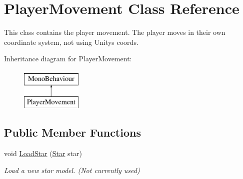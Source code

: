 \hypertarget{class_player_movement}{}\section{Player\+Movement Class Reference}
\label{class_player_movement}


This class contains the player movement. The player moves in their own coordinate system, not using Unity\textquotesingle{}s coords.  


Inheritance diagram for Player\+Movement\+:\begin{figure}[H]
\begin{center}
\leavevmode
\includegraphics[height=2.000000cm]{class_player_movement}
\end{center}
\end{figure}
\subsection*{Public Member Functions}
\begin{DoxyCompactItemize}
\item 
void \mbox{\hyperlink{class_player_movement_afe10130e4f22b8ebda23ea6b452ad5b2}{Load\+Star}} (\mbox{\hyperlink{struct_star}{Star}} star)
\begin{DoxyCompactList}\small\item\em Load a new star model. (Not currently used) \end{DoxyCompactList}\end{DoxyCompactItemize}
